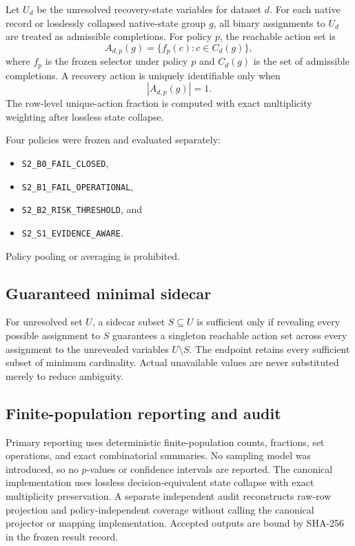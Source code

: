 \documentclass[preprint,12pt]{elsarticle}
\begin{document}
Let $U_d$ be the unresolved recovery-state variables for dataset $d$. For each native record or losslessly collapsed native-state group $g$, all binary assignments to $U_d$ are treated as admissible completions. For policy $p$, the reachable action set is
\[
A_{d,p}(g)=\{f_p(c):c\in C_d(g)\},
\]
where $f_p$ is the frozen selector under policy $p$ and $C_d(g)$ is the set of admissible completions. A recovery action is uniquely identifiable only when
\[
|A_{d,p}(g)|=1.
\]
The row-level unique-action fraction is computed with exact multiplicity weighting after lossless state collapse.

Four policies were frozen and evaluated separately:
\begin{itemize}[nosep,leftmargin=*]
    \item \texttt{S2\_B0\_FAIL\_CLOSED},
    \item \texttt{S2\_B1\_FAIL\_OPERATIONAL},
    \item \texttt{S2\_B2\_RISK\_THRESHOLD}, and
    \item \texttt{S2\_S1\_EVIDENCE\_AWARE}.
\end{itemize}
Policy pooling or averaging is prohibited.

\subsection{Guaranteed minimal sidecar}

For unresolved set $U$, a sidecar subset $S\subseteq U$ is sufficient only if revealing every possible assignment to $S$ guarantees a singleton reachable action set across every assignment to the unrevealed variables $U\setminus S$. The endpoint retains every sufficient subset of minimum cardinality. Actual unavailable values are never substituted merely to reduce ambiguity.

\subsection{Finite-population reporting and audit}

Primary reporting uses deterministic finite-population counts, fractions, set operations, and exact combinatorial summaries. No sampling model was introduced, so no $p$-values or confidence intervals are reported. The canonical implementation uses lossless decision-equivalent state collapse with exact multiplicity preservation. A separate independent audit reconstructs raw-row projection and policy-independent coverage without calling the canonical projector or mapping implementation. Accepted outputs are bound by SHA-256 in the frozen result record.
\end{document}
